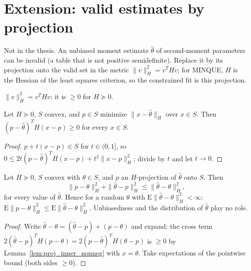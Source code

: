 \chapter{Extension: valid estimates by projection}\label{ch:coneproj}

Not in the thesis. An unbiased moment estimate $\hat\theta$ of second-moment
parameters can be invalid (a table that is not positive semidefinite).
Replace it by its projection onto the valid set in the metric
$\|v\|_H^2 = v^T H v$; for MINQUE, $H$ is the Hessian of the least squares
criterion, so the constrained fit is this projection.

\begin{definition}[$H$-norm]\label{def:hsq}
  \leanok
  $\|v\|_H^2 = v^T H v$; it is $\ge 0$ for $H \succeq 0$.
\end{definition}

\begin{lemma}\label{lem:proj_inner_nonneg}
  \leanok
  Let $H \succeq 0$, $S$ convex, and $p \in S$ minimize
  $\|x - \hat\theta\|_H$ over $x \in S$. Then
  $(p - \hat\theta)^T H (x - p) \ge 0$ for every $x \in S$.
\end{lemma}
\begin{proof}
  \leanok
  $p + t(x-p) \in S$ for $t \in (0,1]$, so
  $0 \le 2t(p-\hat\theta)^T H(x-p) + t^2\|x-p\|_H^2$; divide by $t$ and let
  $t \to 0$.
\end{proof}

\begin{theorem}\label{thm:hsq_proj_le}
  \leanok
  Let $H \succeq 0$, $S$ convex with $\theta \in S$, and $p$ an $H$-projection
  of $\hat\theta$ onto $S$. Then
  \[ \|p - \theta\|_H^2 + \|\hat\theta - p\|_H^2 \le \|\hat\theta - \theta\|_H^2 , \]
  for every value of $\hat\theta$. Hence for a random $\hat\theta$ with
  $\mathrm E\|\hat\theta-\theta\|_H^2 < \infty$:
  $\mathrm E\|p - \theta\|_H^2 \le \mathrm E\|\hat\theta - \theta\|_H^2$.
  Unbiasedness and the distribution of $\hat\theta$ play no role.
\end{theorem}
\begin{proof}
  \leanok
  Write $\hat\theta - \theta = (\hat\theta - p) + (p - \theta)$ and expand; the
  cross term $2(\hat\theta-p)^T H(p-\theta) = 2(p-\hat\theta)^T H(\theta - p)$ is
  $\ge 0$ by Lemma~\ref{lem:proj_inner_nonneg} with $x = \theta$. Take
  expectations of the pointwise bound (both sides $\ge 0$).
\end{proof}

